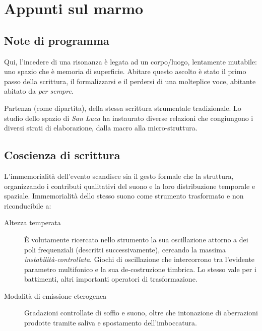 
\chapter{Appunti sul marmo}
\label{cap:appunti}

\section{Note di programma}

Qui, l’incedere di una risonanza è legata ad un corpo/luogo, lentamente mutabile:
uno spazio che è memoria di superficie. Abitare questo ascolto è stato il primo
passo della scrittura, il formalizzarsi e il perdersi di una molteplice voce,
abitante abitato da \emph{per sempre}.

Partenza (come dipartita), della stessa scrittura strumentale tradizionale.
Lo studio dello spazio di \emph{San Luca} ha instaurato diverse relazioni che
congiungono i diversi strati di elaborazione, dalla macro alla micro-struttura.

\section{Coscienza di scrittura}

L'immemorialità dell'evento scandisce sia il gesto formale che la struttura,
organizzando i contributi qualitativi del suono e la loro distribuzione
temporale e spaziale. Immemorialità dello stesso suono come strumento trasformato
e non riconducibile a:

\begin{description}
	\item[ Altezza temperata ] È volutamente ricercato nello strumento la sua
	oscillazione  attorno a dei poli frequenziali (descritti successivamente),
	cercando la massima \emph{instabilità-controllata}. Giochi di oscillazione che
	intercorrono tra l’evidente parametro multifonico e la sua de-costruzione
	timbrica. Lo stesso vale per i battimenti, altri importanti operatori di
	trasformazione.
	\item[ Modalità di emissione eterogenea ] Gradazioni controllate di soffio e
	suono, oltre che intonazione di aberrazioni prodotte tramite saliva e
	spostamento dell'imboccatura.
\end{description}

